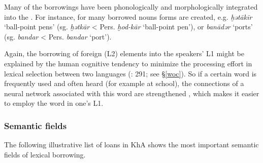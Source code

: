 \documentclass[output=paper,nonflat]{langsci/langscibook}
\begin{document}
Many of the  borrowings have been phonologically and morphologically integrated into the . For instance, for many borrowed  nouns   forms are created, e.g. \textit{ḫətākīr} ‘ball-point pens’ (sg. \textit{ḫətkār} < Pers. \textit{ḫod-kār} ‘ball-point pen’), or \textit{banādər} ‘ports’ (sg. \textit{bandar} < Pers. \textit{bandar} ‘port’).

Again, the borrowing of foreign (L2) elements into the speakers’ L1 might be explained by the human cognitive tendency to minimize the processing effort in lexical selection between two languages (\citealt{Lucas2012}: 291; see §\ref{woc}). So if a certain  word is frequently used and often heard (for example at school), the connections of a neural network associated with this word are strengthened \citep[291]{Lucas2012}, which makes it easier to employ the word in one’s L1. 


\subsubsection{Semantic fields}

The following illustrative list of  loans in KhA shows the most important semantic fields of lexical borrowing.
\end{document}
